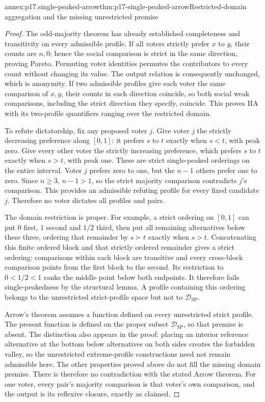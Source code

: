\begin{annexitem}{annex:p17.single-peaked-arrow}{thm:p17-single-peaked-arrow}{Restricted-domain aggregation and the missing unrestricted premise}
\begin{proof}
The odd-majority theorem has already established completeness and
transitivity on every admissible profile. If all voters strictly
prefer \(x\) to \(y\), their counts are \(n,0\); hence the
social comparison is strict in the same direction, proving Pareto.
Permuting voter identities permutes the contributors to every count
without changing its value. The output relation is consequently
unchanged, which is anonymity. If two admissible profiles give each
voter the same comparison of \(x,y\), their counts in each
direction coincide, so both social weak comparisons, including the
strict direction they specify, coincide. This proves IIA with its
two-profile quantifiers ranging over the restricted domain.

To refute dictatorship, fix any proposed voter \(j\). Give voter
\(j\) the strictly decreasing preference along \([0,1]\): it
prefers \(s\) to \(t\) exactly when \(s<t\), with peak zero.
Give every other voter the strictly increasing preference, which
prefers \(s\) to \(t\) exactly when \(s>t\), with peak one.
These are strict single-peaked orderings on the entire interval.
Voter \(j\) prefers zero to one, but the \(n-1\) others prefer
one to zero. Since \(n\geq3\), \(n-1>1\), so the strict
majority comparison contradicts \(j\)'s comparison. This provides
an admissible refuting profile for every fixed candidate \(j\).
Therefore no voter dictates all profiles and pairs.

The domain restriction is proper. For example, a strict ordering
on \([0,1]\) can put \(0\) first, \(1\) second and \(1/2\)
third, then put all remaining alternatives below these three, ordering
that remainder by \(s\succ t\) exactly when \(s>t\). Concatenating this finite
ordered block and that strictly ordered remainder gives a strict
ordering: comparisons within each block are transitive and every
cross-block comparison points from the first block to the second.
Its restriction to \(0<1/2<1\) ranks the middle point below both
endpoints. It therefore fails single-peakedness by the structural
lemma. A profile containing this ordering belongs to the unrestricted
strict-profile space but not to \(\mathcal D_{\mathrm{SP}}\).

Arrow's theorem assumes a function defined on every unrestricted
strict profile. The present function is defined on the proper subset
\(\mathcal D_{\mathrm{SP}}\), so that premise is absent. The
distinction also appears in the proof: placing an interior reference
alternative at the bottom below alternatives on both sides creates
the forbidden valley, so the unrestricted extreme-profile
constructions need not remain admissible here. The other properties
proved above do not fill the missing domain premise. There is
therefore no contradiction with the stated Arrow theorem. For one
voter, every pair's majority comparison is that voter's own comparison,
and the output is its reflexive closure, exactly as claimed.
\end{proof}
\end{annexitem}
